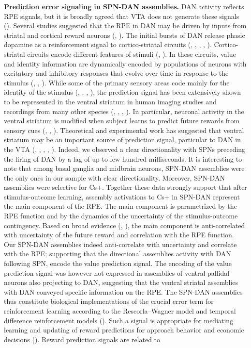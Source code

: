 \textbf{Prediction error signaling in SPN-DAN assemblies.} DAN activity reflects RPE signals, but it is broadly agreed that VTA does not generate these signals (\cite{Schultz2016}). Several studies suggested that the RPE in DAN may be driven by inputs from striatal and cortical reward neurons (\cite{Cai1}, \cite{PadoaSchioppa}). The initial bursts of DAN release phasic dopamine as a reinforcement signal to cortico-striatal circuits (\cite{Redgrave}, \cite{Schultz2002}, \cite{Ungless2004b}, \cite{Wise2004}, \cite{WatabeUchida}). Cortico-striatal circuits encode different features of stimuli (\cite{Rolls}, \cite{Yeshurun}). In these circuits, value and identity information are dynamically encoded by populations of neurons with excitatory and inhibitory responses that evolve over time in response to the stimulus (\cite{Averbeck}, \cite{Bakhurin}, \cite{Laurent}). While some of the primary sensory areas code mainly for the identity of the stimulus (\cite{Kadohisa}, \cite{Stettler}, \cite{Howard}, \cite{Gottfried}), the prediction signal has been extensively shown to be represented in the ventral striatum in human imaging studies and recordings from many other species (\cite{Schultz2000}, \cite{Pagnoni}, \cite{Berridge2003}, \cite{ODoherty2004}). In particular, neuronal activity in the ventral striatum is modified when subject learns to predict future rewards from sensory cues (\cite{Schultz2000}, \cite{Pagnoni}, \cite{Radua}). Theoretical and experimental work has suggested that ventral striatum may be an important source of prediction signal, particular to DAN in the VTA (\cite{Seymour}, \cite{Daw2005}, \cite{ODoherty2004}, \cite{Takahashi2016}, \cite{Willuhn}). Indeed, we observed a clear directionality with SPNs preceding the firing of DAN by a lag of up to few hundred milliseconds. It is interesting to note that among basal ganglia and midbrain neurons, SPN-DAN assemblies were the only ones in our sample with clear directionality. Moreover, SPN-DAN assemblies were selective for Cs+. Together these data strongly support that after stimulus-outcome learning, assembly activations to Cs+ in SPN-DAN represent the main component of the RPE. The main component is parametrized by the RPE function and by the dynamics of the uncertainty of the stimulus-outcome contingency. Based on broad evidence (\cite{Fiorillo}, \cite{Schultz2016}), the main component is anti-correlated with uncertainty of the future reward and correlation with the RPE function. Our SPN-DAN assemblies indeed anti-correlate with uncertainty and correlate with the RPE; supporting that the directional assemblies activity with DAN following SPN, encode the value prediction signal. The encoding of the value prediction signal was however not expressed in assemblies of ventral pallidal neurons also projecting to DAN, suggesting that the ventral striatal assemblies with DAN conveyed specific information on the RPE. The SPN-DAN assemblies thus constitute biological implementations of the crucial error term for reinforcement learning according to the Rescorla–Wagner model and temporal difference reinforcement models (\cite{Montague}). Such a signal is appropriate for mediating learning and updating of reward predictions for approach behavior and economic decisions (\cite{Schultz2016}). Reward prediction signals are related to 